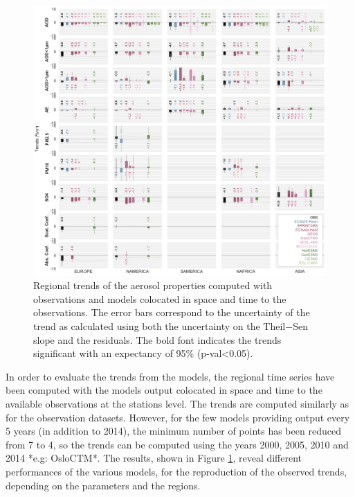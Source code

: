 \documentclass[journal abbreviation, manuscript]{copernicus}
\begin{document}
\begin{figure}[t]
 \includegraphics[width=16cm]{../scripts/figs/heatmaps/BARS.png}
 \caption{Regional trends of the aerosol properties computed with observations and models colocated in space and time to the observations. The error bars correspond to the uncertainty of the trend as calculated using both the uncertainty on the Theil−Sen slope and the residuals. The bold font indicates the trends significant with an expectancy of 95\% (p-val<0.05).}
 \label{fig:bars}
\end{figure}

In order to evaluate the trends from the models, the regional time series have been computed with the models output colocated in space and time to the available observations at the stations level. The trends are computed similarly as for the observation datasets. However, for the few models providing output every 5 years (in addition to 2014), the minimum number of points has been reduced from 7 to 4, so the trends can be computed using the years 2000, 2005, 2010 and 2014 *e.g: OsloCTM*. The results, shown in Figure \ref{fig:bars}, reveal different performances of the various models, for the reproduction of the observed trends, depending on the parameters and the regions.
\end{document}
